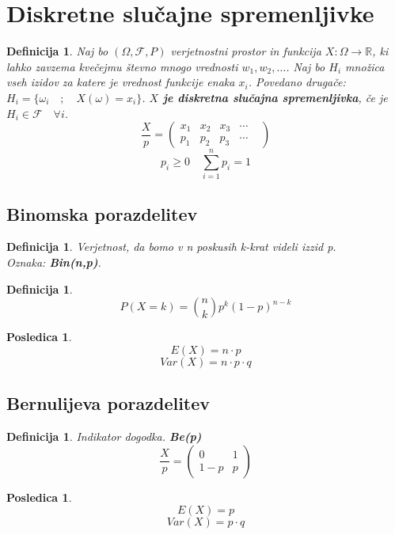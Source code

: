 \documentclass[11pt]{article}
\newtheorem{Posledica}[Izrek]{{\sc Posledica}}
\newtheorem{Definicija}[Izrek]{{\sc Definicija}}
\begin{document}
	\section{Diskretne slučajne spremenljivke}
	\begin{Definicija}
		Naj bo $(\Omega, \mathcal{F}, P) $ verjetnostni prostor in funkcija $X: \Omega \to \mathbb{R}$, ki lahko zavzema kvečejmu števno mnogo vrednosti $w_1, w_2,\dots $. Naj bo $H_i$ množica vseh izidov za katere je vrednost funkcije enaka $x_i$. Povedano drugače:
		$H_i = \{ \omega_i \quad;\quad X(\omega) = x_i\}$. \textbf{$X$ je diskretna slučajna spremenljivka}, če je $H_i \in \mathcal{F} \quad \forall i$.
		\\
		\[
		\frac{X}{p} = \begin{pmatrix}
		x_1 & x_2 & x_3 & \cdots & \\       p_1 & p_2 & p_3 & \cdots & 
		\end{pmatrix}
		\]
		$$p_i \ge 0 \quad \sum_{i=1}^{n}{p_i} = 1$$
	\end{Definicija}
	
	\subsection{Binomska porazdelitev}
	\begin{Definicija}
		Verjetnost, da bomo v n poskusih k-krat videli izzid p.
		\\
		Oznaka: \textbf{Bin(n,p)}.
	\end{Definicija}
	\begin{Definicija}
		$$P(X=k) = \binom{n}{k} p^k (1-p)^{n-k}$$
	\end{Definicija}
	\begin{Posledica}
		$$E(X) = n\cdot p$$
		$$Var(X) = n\cdot p\cdot q$$
	\end{Posledica}
	\subsection{Bernulijeva porazdelitev}
	\begin{Definicija}
		Indikator dogodka. \textbf{Be(p)}
		\[
		\frac{X}{p} = \begin{pmatrix}
		0 & 1 \\       1-p & p  
		\end{pmatrix}
		\]
	\end{Definicija}
	\begin{Posledica}
		$$E(X) = p$$
		$$Var(X) = p\cdot q$$
	\end{Posledica}
\end{document}

